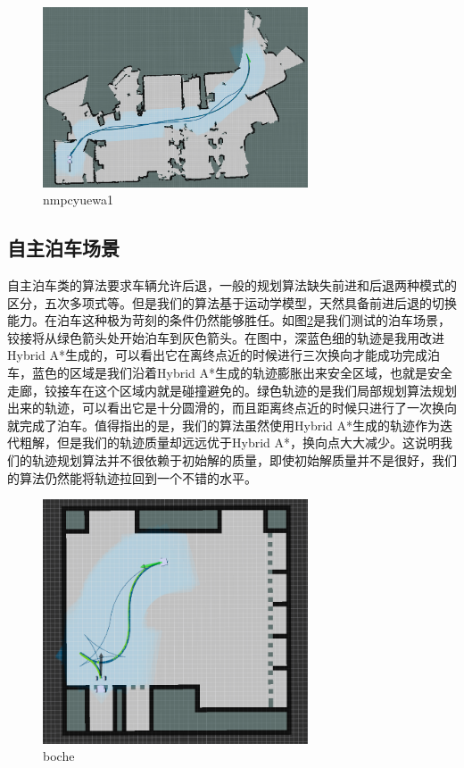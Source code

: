 \documentclass[master,academic]{ysuthesis} %
\begin{document}
	\begin{figure}[!ht]
		\centering
		\includegraphics[width=0.7\textwidth]{nmpcyuewa1.png}
		\caption{nmpcyuewa1}
		\label{fig:nmpcyuewa1}
	\end{figure}


		\subsection{自主泊车场景}
		自主泊车类的算法要求车辆允许后退，一般的规划算法缺失前进和后退两种模式的区分，五次多项式等。但是我们的算法基于运动学模型，天然具备前进后退的切换能力。在泊车这种极为苛刻的条件仍然能够胜任。如图\ref{fig:boche}是我们测试的泊车场景，铰接将从绿色箭头处开始泊车到灰色箭头。在图中，深蓝色细的轨迹是我用改进Hybrid A*生成的，可以看出它在离终点近的时候进行三次换向才能成功完成泊车，蓝色的区域是我们沿着Hybrid A*生成的轨迹膨胀出来安全区域，也就是安全走廊，铰接车在这个区域内就是碰撞避免的。绿色轨迹的是我们局部规划算法规划出来的轨迹，可以看出它是十分圆滑的，而且距离终点近的时候只进行了一次换向就完成了泊车。值得指出的是，我们的算法虽然使用Hybrid A*生成的轨迹作为迭代粗解，但是我们的轨迹质量却远远优于Hybrid A*，换向点大大减少。这说明我们的轨迹规划算法并不很依赖于初始解的质量，即使初始解质量并不是很好，我们的算法仍然能将轨迹拉回到一个不错的水平。
		\begin{figure}[!ht]
			\centering
			\includegraphics[width=0.7\textwidth]{boche.png}
			\caption{boche}
			\label{fig:boche}
		\end{figure}
\end{document}
